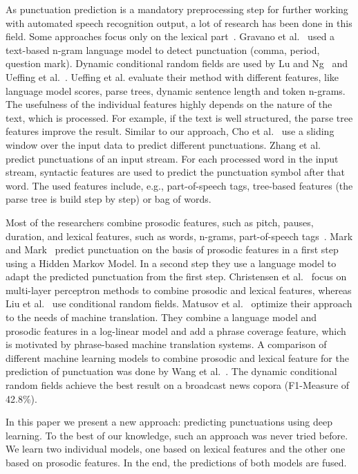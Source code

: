 As punctuation prediction is a mandatory preprocessing step for further working with automated speech recognition output, a lot of research has been done in this field.
Some approaches focus only on the lexical part~\cite{Gravano2009, Lu2010, Ueffing2013, Cho2012, Zhang2013}.
Gravano et al.~\cite{Gravano2009} used a text-based n-gram language model to detect punctuation (comma, period, question mark).
Dynamic conditional random fields are used by Lu and Ng~\cite{Lu2010} and Ueffing et al.~\cite{Ueffing2013}.
Ueffing et al. evaluate their method with different features, like language model scores, parse trees, dynamic sentence length and token n-grams.
The usefulness of the individual features highly depends on the nature of the text, which is processed.
For example, if the text is well structured, the parse tree features improve the result.
Similar to our approach, Cho et al.~\cite{Cho2012} use a sliding window over the input data to predict different punctuations.
Zhang et al.~\cite{Zhang2013} predict punctuations of an input stream.
For each processed word in the input stream, syntactic features are used to predict the punctuation symbol after that word.
The used features include, e.g., part-of-speech tags, tree-based features (the parse tree is build step by step) or bag of words.

Most of the researchers combine prosodic features, such as pitch, pauses, duration, and lexical features, such as words, n-grams, part-of-speech tags~\cite{Mark1999, Christensen2001, Liu2005, Matusov2007, Wang2012}.
Mark and Mark~\cite{Mark1999} predict punctuation on the basis of prosodic features in a first step using a Hidden Markov Model.
In a second step they use a language model to adapt the predicted punctuation from the first step.
Christensen et al.~\cite{Christensen2001} focus on multi-layer perceptron methods to combine prosodic and lexical features, whereas Liu et al.~\cite{Liu2005} use conditional random fields.
Matusov et al.~\cite{Matusov2007} optimize their approach to the needs of machine translation.
They combine a language model and prosodic features in a log-linear model and add a phrase coverage feature, which is motivated by phrase-based machine translation systems.
A comparison of different machine learning models to combine prosodic and lexical feature for the prediction of punctuation was done by Wang et al.~\cite{Wang2012}.
The dynamic conditional random fields achieve the best result on a broadcast news copora (F1-Measure of 42.8\%).

In this paper we present a new approach: predicting punctuations using deep learning.
To the best of our knowledge, such an approach was never tried before.
We learn two individual models, one based on lexical features and the other one based on prosodic features.
In the end, the predictions of both models are fused.

